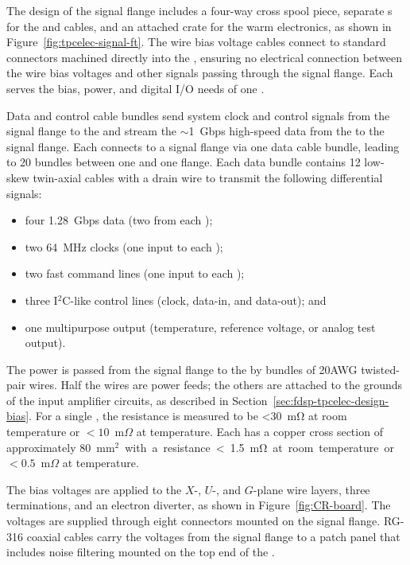 The design of the signal flange includes a four-way cross spool piece, separate  \fdth{}s for the  and  cables, and
an attached crate for the  warm electronics, as shown in Figure~\ref{fig:tpcelec-signal-ft}.
The wire bias voltage cables connect to standard  connectors machined directly into the  \fdth,
ensuring no electrical connection between the wire bias voltages and other signals passing through the signal flange.
Each  \fdth serves the bias, power, and digital I/O needs of one .  

Data and control cable bundles send system clock and control signals from the 
signal flange to the  and stream the $\sim$\SI{1}{Gbps} high-speed data from the  to the signal flange.  Each  
connects to a signal flange via one data cable bundle, leading to 20 bundles between one  and one flange.  Each data bundle contains 12 low-skew twin-axial cables with a drain wire 
to transmit the following differential signals:
\begin{itemize}
    \item four \SI{1.28}{Gbps} data (two from each );
    \item two \SI{64}{MHz} clocks (one input to each );
    \item two fast command lines (one input to each );
    \item three I$^2$C-like control lines (clock, data-in, and data-out); and
    \item one multipurpose  output (temperature, reference voltage, or analog test output).
\end{itemize}

The  power is passed from the signal flange to the  by bundles of
20AWG twisted-pair wires. Half the wires are power feeds; the others
are attached to the grounds of the input amplifier circuits, as described in Section~\ref{sec:fdsp-tpcelec-design-bias}.
For a single , the resistance is measured to be  <\SI{30}{\milli\ohm} at room temperature or $<10$~m$\Omega$ at 
 temperature. Each  has a copper cross section of approximately %
\SI{80}{mm$^2$} with a 
resistance <\SI{1.5}{\milli\ohm} at room temperature or $<0.5$~m$\Omega$ at  temperature.

The bias voltages are applied to the $X$-, $U$-, and $G$-plane wire layers, three  terminations, 
and an electron diverter, as shown in Figure~\ref{fig:CR-board}. The voltages are supplied 
through eight  connectors mounted on the signal flange. RG-316 coaxial cables carry the voltages 
from the signal flange to a patch panel  that includes noise filtering mounted on the top 
end of the . 

